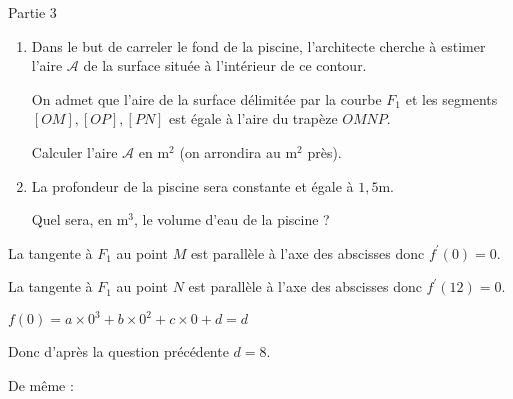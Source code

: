 \begin{h3}Partie 3\end{h3}
\begin{enumerate}
     \item
     Dans le but de carreler le fond de la piscine, l'architecte cherche à estimer l'aire $\mathscr A$  de la surface située à l'intérieur de ce contour.
     \par
     On admet que l'aire de la surface délimitée par  la courbe $F_1$ et les segments $[OM], [OP], [PN]$ est égale à l'aire du trapèze $OMNP$.
     \par
     Calculer l'aire $\mathscr A$ en $\text{m}^2$ (on arrondira au $\text{m}^2$ près).
     \item
     La profondeur de la piscine sera constante et égale à $1,5\text{m}$.
     \par
     Quel sera, en $\text{m}^3$, le volume d'eau de la piscine ?
\end{enumerate}
     La tangente à $F_1$ au point $M$ est parallèle à l'axe des abscisses donc $f ^{\prime}(0)=0$.
     \par
     La tangente à $F_1$ au point $N$ est parallèle à l'axe des abscisses donc $f ^{\prime}(12)=0$.
     \item
     $f(0)=a\times 0^3+b \times 0^2+c \times 0+d=d$
     \par
     Donc d'après la question précédente $d=8$.
     \par
     De même :
     \par
